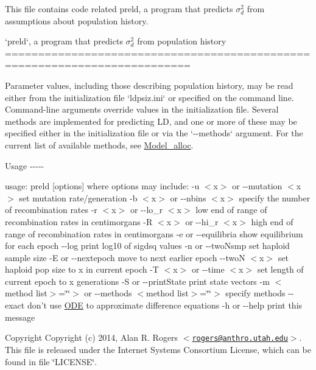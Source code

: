 \-This file contains code related preld, a program that predicts $\sigma_d^2$ from assumptions about population history.

`preld`, a program that predicts $\sigma_d^2$ from population history ==========================================================================

\-Parameter values, including those describing population history, may be read either from the initialization file `ldpsiz.ini` or specified on the command line. \-Command-\/line arguments override values in the initialization file. \-Several methods are implemented for predicting \-L\-D, and one or more of these may be specified either in the initialization file or via the `-\/-\/methods` argument. \-For the current list of available methods, see \hyperlink{model_8h_a1c02862e00fd2fd232c5ba777beadc84}{\-Model\-\_\-alloc}.

\-Usage -\/-\/-\/-\/-\/

usage\-: preld \mbox{[}options\mbox{]} where options may include\-: -\/u $<$x$>$ or -\/-\/mutation $<$x$>$ set mutation rate/generation -\/b $<$x$>$ or -\/-\/nbins $<$x$>$ specify the number of recombination rates -\/r $<$x$>$ or -\/-\/lo\-\_\-r $<$x$>$ low end of range of recombination rates in centimorgans -\/\-R $<$x$>$ or -\/-\/hi\-\_\-r $<$x$>$ high end of range of recombination rates in centimorgans -\/e or -\/-\/equilibria show equilibrium for each epoch -\/-\/log print log10 of sigdsq values -\/n or -\/-\/two\-Nsmp set haploid sample size -\/\-E or -\/-\/nextepoch move to next earlier epoch -\/-\/two\-N $<$x$>$ set haploid pop size to x in current epoch -\/\-T $<$x$>$ or -\/-\/time $<$x$>$ set length of current epoch to x generations -\/\-S or -\/-\/print\-State print state vectors -\/m $<$method list$>$=\char`\"{}\char`\"{}$>$ or -\/-\/methods $<$method list$>$=\char`\"{}\char`\"{}$>$ specify methods -\/-\/exact don't use \hyperlink{struct_o_d_e}{\-O\-D\-E} to approximate difference equations -\/h or -\/-\/help print this message

\begin{DoxyCopyright}{\-Copyright}
\-Copyright (c) 2014, \-Alan \-R. \-Rogers $<$\href{mailto:rogers@anthro.utah.edu}{\tt rogers@anthro.\-utah.\-edu}$>$. \-This file is released under the \-Internet \-Systems \-Consortium \-License, which can be found in file \char`\"{}\-L\-I\-C\-E\-N\-S\-E\char`\"{}. 
\end{DoxyCopyright}
